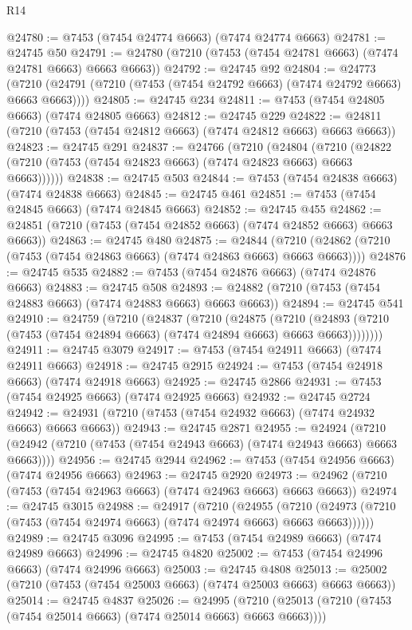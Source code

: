 \begin{lexlean}{R14}
\begin{coremodule}
@24780 := @7453 (@7454 @24774 @6663) (@7474 @24774 @6663)
@24781 := @24745 @50
@24791 := @24780 (@7210 (@7453 (@7454 @24781 @6663) (@7474 @24781 @6663) @6663 @6663))
@24792 := @24745 @92
@24804 := @24773
    (@7210 (@24791 (@7210 (@7453 (@7454 @24792 @6663) (@7474 @24792 @6663) @6663 @6663))))
@24805 := @24745 @234
@24811 := @7453 (@7454 @24805 @6663) (@7474 @24805 @6663)
@24812 := @24745 @229
@24822 := @24811 (@7210 (@7453 (@7454 @24812 @6663) (@7474 @24812 @6663) @6663 @6663))
@24823 := @24745 @291
@24837 := @24766
    (@7210
      (@24804
        (@7210 (@24822 (@7210 (@7453 (@7454 @24823 @6663) (@7474 @24823 @6663) @6663 @6663))))))
@24838 := @24745 @503
@24844 := @7453 (@7454 @24838 @6663) (@7474 @24838 @6663)
@24845 := @24745 @461
@24851 := @7453 (@7454 @24845 @6663) (@7474 @24845 @6663)
@24852 := @24745 @455
@24862 := @24851 (@7210 (@7453 (@7454 @24852 @6663) (@7474 @24852 @6663) @6663 @6663))
@24863 := @24745 @480
@24875 := @24844
    (@7210 (@24862 (@7210 (@7453 (@7454 @24863 @6663) (@7474 @24863 @6663) @6663 @6663))))
@24876 := @24745 @535
@24882 := @7453 (@7454 @24876 @6663) (@7474 @24876 @6663)
@24883 := @24745 @508
@24893 := @24882 (@7210 (@7453 (@7454 @24883 @6663) (@7474 @24883 @6663) @6663 @6663))
@24894 := @24745 @541
@24910 := @24759
    (@7210
      (@24837
        (@7210
          (@24875
            (@7210
              (@24893 (@7210 (@7453 (@7454 @24894 @6663) (@7474 @24894 @6663) @6663 @6663))))))))
@24911 := @24745 @3079
@24917 := @7453 (@7454 @24911 @6663) (@7474 @24911 @6663)
@24918 := @24745 @2915
@24924 := @7453 (@7454 @24918 @6663) (@7474 @24918 @6663)
@24925 := @24745 @2866
@24931 := @7453 (@7454 @24925 @6663) (@7474 @24925 @6663)
@24932 := @24745 @2724
@24942 := @24931 (@7210 (@7453 (@7454 @24932 @6663) (@7474 @24932 @6663) @6663 @6663))
@24943 := @24745 @2871
@24955 := @24924
    (@7210 (@24942 (@7210 (@7453 (@7454 @24943 @6663) (@7474 @24943 @6663) @6663 @6663))))
@24956 := @24745 @2944
@24962 := @7453 (@7454 @24956 @6663) (@7474 @24956 @6663)
@24963 := @24745 @2920
@24973 := @24962 (@7210 (@7453 (@7454 @24963 @6663) (@7474 @24963 @6663) @6663 @6663))
@24974 := @24745 @3015
@24988 := @24917
    (@7210
      (@24955
        (@7210 (@24973 (@7210 (@7453 (@7454 @24974 @6663) (@7474 @24974 @6663) @6663 @6663))))))
@24989 := @24745 @3096
@24995 := @7453 (@7454 @24989 @6663) (@7474 @24989 @6663)
@24996 := @24745 @4820
@25002 := @7453 (@7454 @24996 @6663) (@7474 @24996 @6663)
@25003 := @24745 @4808
@25013 := @25002 (@7210 (@7453 (@7454 @25003 @6663) (@7474 @25003 @6663) @6663 @6663))
@25014 := @24745 @4837
@25026 := @24995
    (@7210 (@25013 (@7210 (@7453 (@7454 @25014 @6663) (@7474 @25014 @6663) @6663 @6663))))

\end{coremodule}
\end{lexlean}
